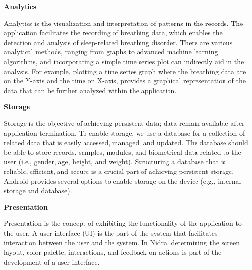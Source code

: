 \noindent \textbf{Analytics}

\noindent Analytics is the visualization and interpretation of patterns in the records. The application facilitates the recording of breathing data, which enables the detection and analysis of sleep-related breathing disorder. There are various analytical methods, ranging from graphs to advanced machine learning algorithms, and incorporating a simple time series plot can indirectly aid in the analysis. For example, plotting a time series graph where the breathing data are on the Y-axis and the time on X-axis, provides a graphical representation of the data that can be further analyzed within the application.

\noindent \textbf{Storage}

\noindent Storage is the objective of achieving persistent data; data remain available after application termination. To enable storage, we use a database for a collection of related data that is easily accessed, managed, and updated. The database should be able to store records, samples, modules, and biometrical data related to the user (i.e., gender, age, height, and weight). Structuring a database that is reliable, efficient, and secure is a crucial part of achieving persistent storage. Android provides several options to enable storage on the device (e.g., internal storage and database).

\noindent \textbf{Presentation}

\noindent Presentation is the concept of exhibiting the functionality of the application to the user. A user interface (UI) is the part of the system that facilitates interaction between the user and the system. In Nidra, determining the screen layout, color palette, interactions, and feedback on actions is part of the development of a user interface. 